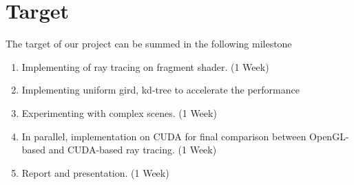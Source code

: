 \section{Target}
The target of our project can be summed in the following milestone 
\begin{enumerate}
\item Implementing of ray tracing on fragment shader. (1 Week)
\item Implementing uniform gird, kd-tree to accelerate the performance
\item Experimenting with complex scenes. (1 Week)
\item In parallel, implementation on CUDA for final comparison between OpenGL-based and CUDA-based ray tracing. (1 Week)
\item Report and presentation. (1 Week)
\end{enumerate}